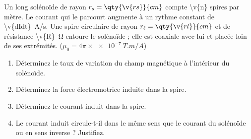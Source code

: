 Un long solénoïde de rayon $r_s = \qty{\v{rs}}{cm}$ compte \num{\v{n}} spires par mètre. Le courant qui le parcourt augmente à un rythme constant de \qty{\v{dIdt}}{A/s}. Une spire circulaire de rayon $r_\ell = \qty{\v{rl}}{cm}$ et de résistance \qty{\v{R}}{\ohm} entoure le solénoïde ; elle est coaxiale avec lui et placée loin de ses extrémités. ($\mu_0 = 4\pi \times \qty{e-7}{T.m/A}$)

\begin{enumerate}[label=\alph*)]
    \item Déterminez le taux de variation du champ magnétique à l'intérieur du solénoïde.
    \item Déterminez la force électromotrice induite dans la spire.
    \item Déterminez le courant induit dans la spire.
    \item Le courant induit circule-t-il dans le même sens que le courant du solénoïde ou en sens inverse ? Justifiez.
\end{enumerate}
